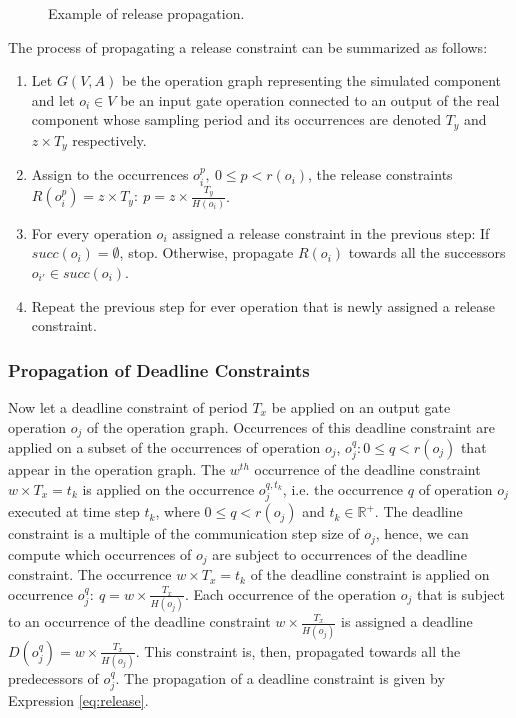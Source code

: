 \begin{figure}[phbt]
\centering

\caption{Example of release propagation.}
\label{fig:rpropagation}
\end{figure}

The process of propagating a release constraint can be summarized as follows:

\begin{enumerate}
\item Let $G(V,A)$ be the operation graph representing the simulated component and let $o_i \in  V$ be an input gate operation connected to an output of the real component whose sampling period and its occurrences are denoted $T_y$ and $z \times T_y$ respectively.
\item Assign to the occurrences $o_i^p,\ 0 \leq p < r(o_i)$, the release constraints $R(o_i^p) = z \times T_y:\ p = z \times \frac{T_y}{H(o_i)}$.
\item For every operation $o_i$ assigned a release constraint in the previous step: If $succ(o_i) = \emptyset$, stop. Otherwise, propagate $R(o_i)$ towards all the successors $o_{i'} \in succ(o_i)$.
\item Repeat the previous step for ever operation that is newly assigned a release constraint.
\end{enumerate}

\subsubsection{Propagation of Deadline Constraints}

Now let a deadline constraint of period $T_x$ be applied on an output gate operation $o_j$ of the operation graph. Occurrences of this deadline constraint are applied on a subset of the occurrences of operation $o_j$, $o_j^q: 0 \leq q < r(o_j)$ that appear in the operation graph. The $w^{th}$ occurrence of the deadline constraint $w \times T_x = t_k$ is applied on the occurrence $o^{q,t_k}_j $, i.e. the occurrence $q$ of operation $o_j$ executed at time step $t_k$, where $0 \leq q < r(o_j)$ and $t_k \in \mathbb{R}^+$. The deadline constraint is a multiple of the communication step size of $o_j$, hence, we can compute which occurrences of $o_j$ are subject to occurrences of the deadline constraint. The occurrence $w \times T_x = t_k$ of the deadline constraint is applied on occurrence $o_j^q:\ q = w \times \frac{T_x}{H(o_j)}$. Each occurrence of the operation $o_j$ that is subject to an occurrence of the deadline constraint $w \times \frac{T_x}{H(o_j)}$ is assigned a deadline $D(o_j^q) = w \times \frac{T_x}{H(o_j)}$. This constraint is, then, propagated towards all the predecessors of $o_j^q$. The propagation of a deadline constraint is given by Expression \ref{eq:release}.

